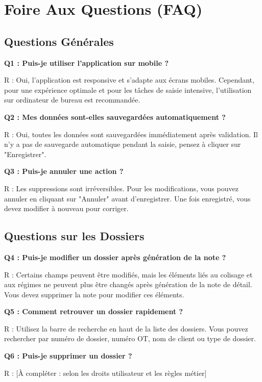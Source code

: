 \documentclass[12pt,a4paper]{report}
\begin{document}
\chapter{Foire Aux Questions (FAQ)}

\section{Questions Générales}

\textbf{Q1 : Puis-je utiliser l'application sur mobile ?}

R : Oui, l'application est responsive et s'adapte aux écrans mobiles. Cependant, pour une expérience optimale et pour les tâches de saisie intensive, l'utilisation sur ordinateur de bureau est recommandée.

\textbf{Q2 : Mes données sont-elles sauvegardées automatiquement ?}

R : Oui, toutes les données sont sauvegardées immédiatement après validation. Il n'y a pas de sauvegarde automatique pendant la saisie, pensez à cliquer sur "Enregistrer".

\textbf{Q3 : Puis-je annuler une action ?}

R : Les suppressions sont irréversibles. Pour les modifications, vous pouvez annuler en cliquant sur "Annuler" avant d'enregistrer. Une fois enregistré, vous devez modifier à nouveau pour corriger.

\section{Questions sur les Dossiers}

\textbf{Q4 : Puis-je modifier un dossier après génération de la note ?}

R : Certains champs peuvent être modifiés, mais les éléments liés au colisage et aux régimes ne peuvent plus être changés après génération de la note de détail. Vous devez supprimer la note pour modifier ces éléments.

\textbf{Q5 : Comment retrouver un dossier rapidement ?}

R : Utilisez la barre de recherche en haut de la liste des dossiers. Vous pouvez rechercher par numéro de dossier, numéro OT, nom de client ou type de dossier.

\textbf{Q6 : Puis-je supprimer un dossier ?}

R : [À compléter : selon les droits utilisateur et les règles métier]
\end{document}
